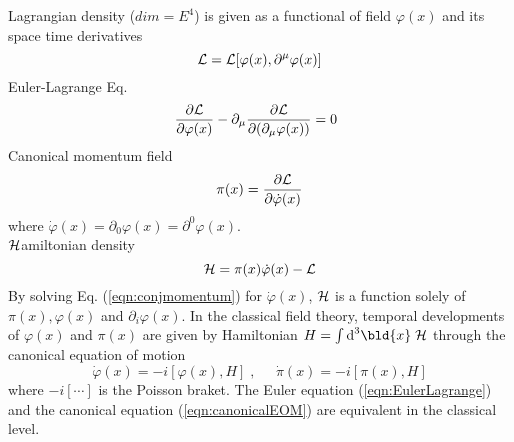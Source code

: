 {\cal L}agrangian density ($dim = E^4$) is given as a functional of field $\varphi(x)$
and its space time derivatives
\begin{equation}
	{\cal L} = {\cal L}[\varphi(x), \partial^\mu\varphi(x)]
\end{equation}
Euler-Lagrange Eq.
\begin{equation}
 \frac{ \partial {\cal L}}{ \partial {\varphi}(x) } - 
\partial_\mu \frac{ \partial {\cal L}}{ \partial (\partial_\mu {\varphi}(x) )} = 0
 \;\;
 \label{eqn:EulerLagrange}
\end{equation}
Canonical momentum field
\begin{equation}
\pi(x) = \frac{ \partial {\cal L}}{ \partial \dot{\varphi}(x) }
\label{eqn:conjmomentum}
\end{equation}
where $\dot{\varphi}(x) = \partial_0 \varphi(x) = \partial^0 \varphi(x)$.\\
${\cal H}$amiltonian density
\begin{equation}
{\cal H} = \pi(x) \dot{\varphi}(x) -  {\cal L}
\label{eqn:Hamiltoniandensity}
\end{equation}
By solving Eq. (\ref{eqn:conjmomentum}) for $\dot\varphi(x)$,
${\cal H}$ is a function solely of $\pi(x), \varphi(x)$ and $ \partial_i \varphi(x)$.
In the classical field theory, temporal developments of $\varphi(x)$ and $\pi(x)$
are given by Hamiltonian $H = \int \mbox{d}^3\bld{x} \; {\cal H}$
through the canonical equation of motion
\begin{equation}
\dot{\varphi}(x) = -i [\varphi(x), H ]\;, \; \; \; \; \; \dot{\pi}(x) = -i [\pi(x), H ]
\label{eqn:canonicalEOM}
\end{equation}
where $-i[\cdots]$ is the Poisson braket.
The Euler equation (\ref{eqn:EulerLagrange}) and 
the canonical equation (\ref{eqn:canonicalEOM})
are equivalent in the classical level.

\bigskip

